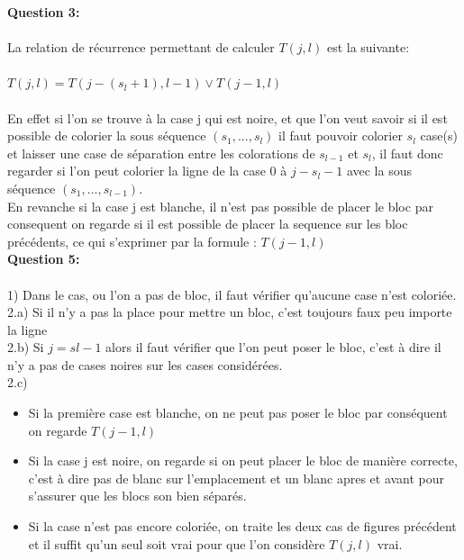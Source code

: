 \documentclass[a4paper]{memoir}
\begin{document}
 	\textbf{Question 3:}\\\\
 	La relation de récurrence permettant de calculer $T(j,l)$ est la suivante:\\\\
 	$T(j, l) = T(j-(s_{l}+1),l-1) \vee T(j-1,l)$\\\\
 	En effet si l'on se trouve à la case j qui est noire, et que l'on veut savoir si il est possible de colorier la sous séquence $(s_{1}, ..., s_{l})$ il faut pouvoir colorier $s_{l}$ case(s) et laisser une case de séparation entre les colorations de $s_{l-1}$ et $s_{l}$, il faut donc regarder si l'on peut colorier la ligne de la case 0 à $j - s_{l} - 1$ avec la sous séquence $(s_{1}, ..., s_{l-1})$. \\
        En revanche si la case j est blanche, il n'est pas possible de placer le bloc par consequent on regarde si il est possible de placer la sequence sur les bloc précédents, ce qui s'exprimer par la formule : $T(j-1,l)$ \\


        \textbf{Question 5:}\\\\
        1) Dans le cas, ou l'on a pas de bloc, il faut vérifier qu'aucune case n'est coloriée.\\
        2.a) Si il n'y a pas la place pour mettre un bloc, c'est toujours faux peu importe la ligne \\
        2.b) Si $j = sl-1$ alors il faut vérifier que l'on peut poser le bloc, c'est à dire il n'y a pas de cases noires sur les cases considérées. \\
        2.c) \begin{itemize}
        \item Si la première case est blanche, on ne peut pas poser le bloc par conséquent on regarde $T(j-1,l)$
        \item Si la case j est noire, on regarde si on peut placer le bloc de manière correcte, c'est à dire pas de blanc sur l'emplacement et un blanc apres et avant pour s'assurer que les blocs son bien séparés.
        \item Si la case n'est pas encore coloriée, on traite les deux cas de figures précédent et il suffit qu'un seul soit vrai pour que l'on considère $T(j,l)$ vrai.
          \end{itemize}
 
\end{document}

